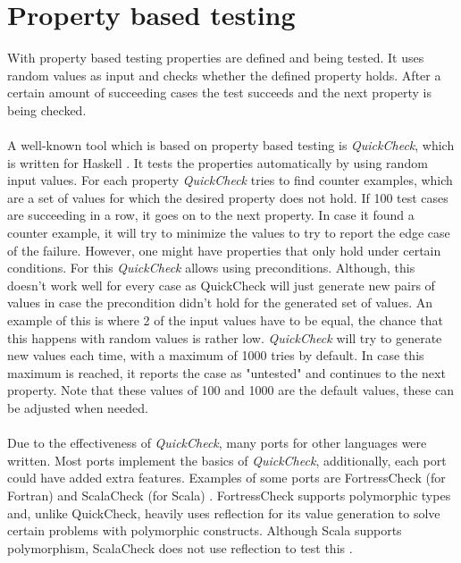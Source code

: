 \section{Property based testing}
With property based testing properties are defined and being tested. It uses random values as input and checks whether the defined property holds. After a certain amount of succeeding cases the test succeeds and the next property is being checked.\\
\\
A well-known tool which is based on property based testing is
\textit{QuickCheck}, which is written for Haskell \cite{claessen2011quickcheck}.
It tests the properties automatically by using random input values. For each property \textit{QuickCheck} tries to find counter examples, which are a set of values for which the desired property does not hold. If 100 test cases are succeeding in a row, it goes on to the next property. In case it found a counter example, it will try to minimize the values to try to report the edge case of the failure. However, one might have properties that only hold under certain conditions. For this \textit{QuickCheck} allows using preconditions. Although, this doesn't work well for every case as QuickCheck will just generate new pairs of values in case the precondition didn't hold for the generated set of values. An example of this is where 2 of the input values have to be equal, the chance that this happens with random values is rather low. \textit{QuickCheck} will try to generate new values each time, with a maximum of 1000 tries by default. In case this maximum is reached, it reports the case as "untested" and continues to the next property. Note that these values of 100 and 1000 are the default values, these can be adjusted when needed.\\
\\
Due to the effectiveness of \textit{QuickCheck}, many ports for other languages were written. Most ports implement the basics of \textit{QuickCheck}, additionally, each port could have added extra features. Examples of some ports are FortressCheck (for Fortran) \cite{kang2011fortresscheck} and ScalaCheck (for Scala) \cite{siteScalaCheck2015}. FortressCheck supports polymorphic types and, unlike QuickCheck, heavily uses reflection for its value generation to solve certain problems with polymorphic constructs. Although Scala supports polymorphism, ScalaCheck does not use reflection to test this \cite{kang2011fortresscheck}.\\
